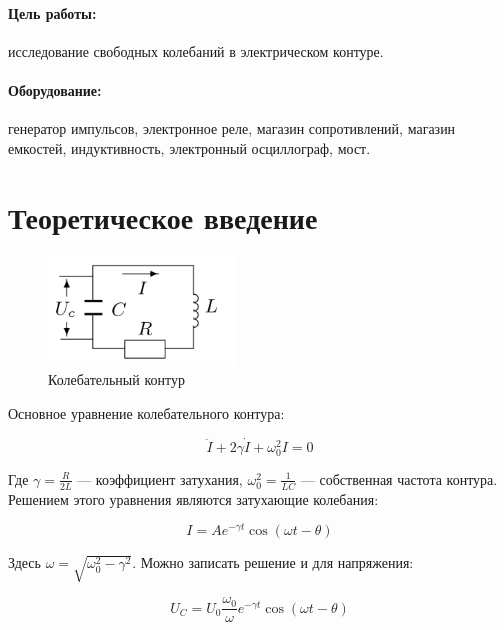 






\paragraph*{Цель работы:} исследование свободных колебаний в электрическом контуре.

\paragraph*{Оборудование:} генератор импульсов, электронное реле, магазин сопротивлений, магазин емкостей, индуктивность, электронный осциллограф, мост.



\section{Теоретическое введение}

\begin{figure}[h]
	\includegraphics[width=5cm]{pics/RLC.png}
	\caption{Колебательный контур}
	\label{RLC}
\end{figure}


Основное уравнение колебательного контура:

\begin{equation}\label{ddot I}
    \ddot{I} + 2\gamma\dot{I} + \omega_0^2I = 0
\end{equation}

Где ${\gamma = \frac{R}{2L}}$ --- коэффициент затухания, $ \omega_0^2 = \frac{1}{LC} $ --- собственная частота контура. Решением этого уравнения являются затухающие колебания:

\begin{equation}\label{}
I = A e^{-\gamma t} \cos (\omega t - \theta)
\end{equation}

Здесь $ \omega = \sqrt{\omega_0^2 - \gamma^2} $. Можно записать решение и для напряжения:

\begin{equation}\label{}
U_C = U_0 \frac{\omega_0}{\omega} e^{-\gamma t}\cos (\omega t - \theta)
\end{equation}

